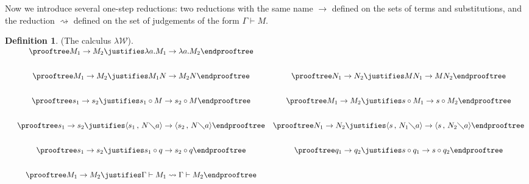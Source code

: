 \documentclass[11pt]{amsart}
\def\ruleone#1#2{\prooftree #1 \justifies #2 \endprooftree}
\theoremstyle{plain}
\theoremstyle{definition}
\newtheorem{definition}[theorem]{Definition}
\theoremstyle{remark}
\numberwithin{equation}{section}
\newcommand{\ci}{\circ}
\newcommand{\ri}{\rightsquigarrow}
\newcommand{\mi}{\,,\,}
\newcommand{\is}{\diagdown}
\newcommand{\arrow}{\rightarrow}
\newcommand{\x}{a}
\renewcommand{\pi}{\mathcal{W}}
\begin{document}
Now we introduce several one-step reductions: two reductions with
the same name $\arrow$ defined on the sets of terms and
substitutions, and the reduction $\ri$ defined on the set of
judgements of the form $\Gamma\vdash M$.
\begin{definition}\label{lambdapi}(The calculus $\lambda\pi$).\\[10pt]
$
\begin{array}{ccc}
& \ruleone{ M_1\arrow M_2}{ \lambda
\x.M_1\arrow\lambda \x.M_2}\\[20pt]
& \ruleone{ M_1\arrow M_2}{ M_1N\arrow  M_2N} & \ruleone{
N_1\arrow N_2}{
MN_1\arrow  MN_2}\\[20pt]
& \ruleone{  s_1\arrow s_2}{s_1\ci M\arrow s_2\ci M} & \ruleone{
M_1\arrow
M_2}{s\ci M_1\arrow s\ci M_2}\\[20pt]
& \ruleone{ s_1\arrow s_2}{ \langle s_1\mi N\is \x\rangle\arrow
\langle s_2\mi N\is \x\rangle} & \ruleone{ N_1\arrow N_2}{ \langle
s\mi N_1\is \x\rangle\arrow \langle
s\mi N_2\is \x\rangle}\\[20pt]
& \ruleone{ s_1\arrow s_2}{ s_1\ci q\arrow s_2\ci q} & \ruleone{
q_1\arrow q_2}{ s\ci q_1\arrow s\ci
q_2}\\[20pt]
& \ruleone{M_1\arrow M_2}{\Gamma\vdash M_1\ri
\Gamma\vdash M_2}\\[20pt]
\end{array}
$


\end{definition}
\end{document}
